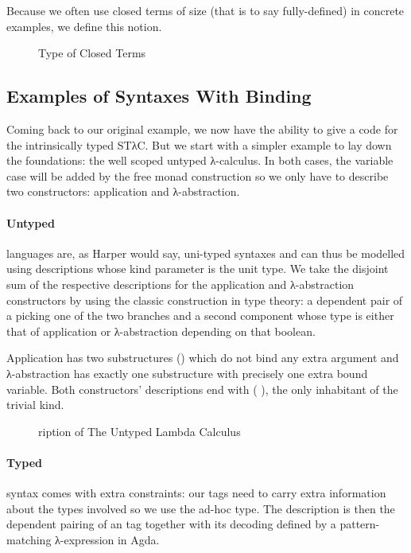 Because we often use closed terms of size  (that is to say fully-defined)
in concrete examples, we define this notion.

\begin{figure}[h]
\caption{Type of Closed Terms\label{fig:closedtm}}
\end{figure}

\subsection{Examples of Syntaxes With Binding}

Coming back to our original example, we now have the ability to give a code for
the intrinsically typed STλC. But we start with a simpler example to lay
down the foundations: the well scoped untyped λ-calculus. In both cases, the
variable case will be added by the free monad construction so we only have to
describe two constructors: application and λ-abstraction.

\paragraph{Untyped} languages are, as Harper would say, uni-typed syntaxes and
can thus be modelled using descriptions whose kind parameter is the unit type.
We take the disjoint sum of the respective descriptions for the application and
λ-abstraction constructors by using the classic construction in type theory: a
dependent pair of a  picking one of the two branches and a second
component whose type is either that of application or λ-abstraction depending
on that boolean.

Application has two substructures () which do not bind any extra argument
and λ-abstraction has exactly one substructure with precisely one extra bound variable.
Both constructors' descriptions end with ( ), the only inhabitant
of the trivial kind.

\begin{figure}[h]
\caption{ription of The Untyped Lambda Calculus\label{fig:desculc}}
\end{figure}


\paragraph{Typed} syntax comes with extra constraints: our tags need to carry
extra information about the types involved so we use the ad-hoc  type.
The description is then the dependent pairing of an  tag together with
its decoding defined by a pattern-matching λ-expression in Agda.

